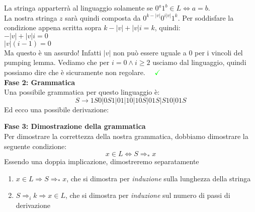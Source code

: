 \documentclass[a4paper,oneside]{scrbook}
\newcommand{\greenmark}{\quad \textcolor{green}{\checkmark}}
\newcommand{\blue}[1]{\textcolor{blue}{#1}}
\begin{document}
La stringa apparterrà al linguaggio solamente se $0^a1^b\in L \Leftrightarrow a=b$.\\
La nostra stringa $z$ sarà quindi composta da $0^{k-|v|}0^{i|v|}1^k$. Per soddisfare la condizione appena scritta sopra $k-|v|+|v|i=k$, quindi:\\
$-|v|+|v|i=0$\\
$|v|(i-1)=0$\\
Ma questo è un assurdo! Infatti $|v|$ non può essere uguale a $0$ per i vincoli del pumping lemma.
Vediamo che per $i=0 \wedge i\geq2$ usciamo dal linguaggio, quindi possiamo dire che è sicuramente non regolare. $\greenmark$\\
\textbf{Fase 2: Grammatica}\\
Una possibile grammatica per questo linguaggio è:
$$S \rightarrow 1S0|0S1|01|10|10S|01S|S10|01S$$
Ed ecco una possibile derivazione:
\begin{center}
\end{center}
\textbf{Fase 3: Dimostrazione della grammatica}\\
Per dimostrare la correttezza della nostra grammatica, dobbiamo dimostrare la seguente condizione:
$$x\in L \Leftrightarrow S \Rightarrow_* x$$
Essendo una doppia implicazione, dimostreremo separatamente
\begin{enumerate}
	\item $x\in L \Rightarrow S \Rightarrow_* x $, che si dimostra per \textit{induzione} sulla lunghezza della stringa
	\item $ S \Rightarrow_i k \Rightarrow x \in L$, che si dimostra per \textit{induzione} sul numero di passi di derivazione
\end{enumerate}
\end{document}
